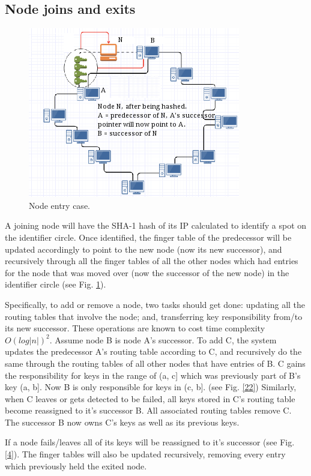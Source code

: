 \documentclass[fleqn,24pt]{SelfArx} %
\begin{document}
\subsection{Node joins and exits}

\begin{figure}[!htb]
\includegraphics{Selection_153.png}
\caption{\label{family}Node entry case.}
\label{3}
\end{figure}

A joining node will have the SHA-1 hash of its IP calculated to identify a spot on the identifier circle. Once identified, the finger table of the predecessor will be updated accordingly to point to the new node (now its new successor), and recursively through all the finger tables of all the other nodes which had entries for the node that was moved over (now the successor of the new node) in the identifier circle (see Fig. \ref{3}). 

Specifically, to add or remove a node, two tasks should get done: updating all the routing tables that involve the node; and, transferring key responsibility from/to its new successor. These operations are known to cost time complexity $O(log|n|)^2$. Assume node B is node A's successor. To add C, the system updates the predecessor A's routing table according to C, and recursively do the same through the routing tables of all other nodes that have entries of B. C gains the responsibility for keys in the range of (a, c] which was previously part of B's key (a, b]. Now B is only responsible for keys in (c, b]. (see Fig. \ref{22}) Similarly, when C leaves or gets detected to be failed, all keys stored in C's routing table become reassigned to it's successor B. All associated routing tables remove C. The successor B now owns C's keys as well as its previous keys.

If a node fails/leaves all of its keys will be reassigned to it’s successor (see Fig. \ref{4}). The finger tables will also be updated recursively, removing every entry which previously held the exited node.
\end{document}
